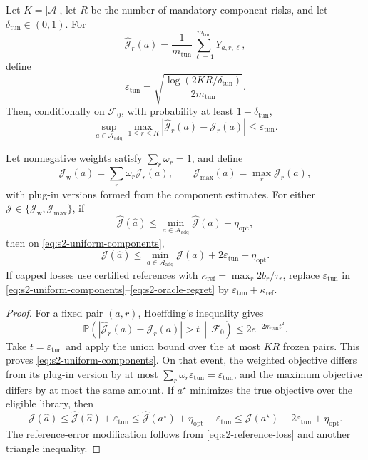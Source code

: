 \begin{theorem}
\label{thm:s2-operational-selection}
Let \(K=|\mathcal A|\), let \(R\) be the number of mandatory component risks,
and let \(\delta_{\mathrm{tun}}\in(0,1)\).  For
\[
 \widehat{\mathcal J}_r(a)
 =
 \frac1{m_{\mathrm{tun}}}
 \sum_{\ell=1}^{m_{\mathrm{tun}}}Y_{a,r,\ell},
\]
define
\begin{equation}
 \varepsilon_{\mathrm{tun}}
 =
 \sqrt{
  \frac{\log(2KR/\delta_{\mathrm{tun}})}
       {2m_{\mathrm{tun}}}
 }.
 \label{eq:s2-tuning-epsilon}
\end{equation}
Then, conditionally on \(\mathcal F_0\), with probability at least
\(1-\delta_{\mathrm{tun}}\),
\begin{equation}
 \sup_{a\in\mathcal A_{\mathrm{adq}}}
 \max_{1\leq r\leq R}
 \left|
  \widehat{\mathcal J}_r(a)-\mathcal J_r(a)
 \right|
 \leq\varepsilon_{\mathrm{tun}}.
 \label{eq:s2-uniform-components}
\end{equation}

Let nonnegative weights satisfy \(\sum_r\omega_r=1\), and define
\[
 \mathcal J_{\mathrm w}(a)=\sum_r\omega_r\mathcal J_r(a),
 \qquad
 \mathcal J_{\max}(a)=\max_r\mathcal J_r(a),
\]
with plug-in versions formed from the component estimates.  For either
\(\mathcal J\in\{\mathcal J_{\mathrm w},\mathcal J_{\max}\}\), if
\[
 \widehat{\mathcal J}(\widehat a)
 \leq
 \min_{a\in\mathcal A_{\mathrm{adq}}}
 \widehat{\mathcal J}(a)
 +
 \eta_{\mathrm{opt}},
\]
then on \eqref{eq:s2-uniform-components},
\begin{equation}
 \mathcal J(\widehat a)
 \leq
 \min_{a\in\mathcal A_{\mathrm{adq}}}\mathcal J(a)
 +
 2\varepsilon_{\mathrm{tun}}
 +
 \eta_{\mathrm{opt}}.
 \label{eq:s2-oracle-regret}
\end{equation}
If capped losses use certified references with
\(\kappa_{\mathrm{ref}}=\max_r2b_r/\tau_r\), replace
\(\varepsilon_{\mathrm{tun}}\) in
\eqref{eq:s2-uniform-components}--\eqref{eq:s2-oracle-regret} by
\(\varepsilon_{\mathrm{tun}}+\kappa_{\mathrm{ref}}\).
\end{theorem}

\begin{proof}
For a fixed pair \((a,r)\), Hoeffding's inequality gives
\[
 \mathbb P\left(
  |\widehat{\mathcal J}_r(a)-\mathcal J_r(a)|>t
  \,\middle|\,\mathcal F_0
 \right)
 \leq2e^{-2m_{\mathrm{tun}}t^2}.
\]
Take \(t=\varepsilon_{\mathrm{tun}}\) and apply the union bound over the
at most \(KR\) frozen pairs.  This proves
\eqref{eq:s2-uniform-components}.  On that event, the weighted objective
differs from its plug-in version by at most
\(\sum_r\omega_r\varepsilon_{\mathrm{tun}}
=\varepsilon_{\mathrm{tun}}\), and the maximum objective differs by at most
the same amount.  If \(a^\star\) minimizes the true objective over the eligible
library, then
\[
 \mathcal J(\widehat a)
 \leq
 \widehat{\mathcal J}(\widehat a)+\varepsilon_{\mathrm{tun}}
 \leq
 \widehat{\mathcal J}(a^\star)
 +\eta_{\mathrm{opt}}+\varepsilon_{\mathrm{tun}}
 \leq
 \mathcal J(a^\star)
 +2\varepsilon_{\mathrm{tun}}+\eta_{\mathrm{opt}}.
\]
The reference-error modification follows from
\eqref{eq:s2-reference-loss} and another triangle inequality.
\end{proof}

